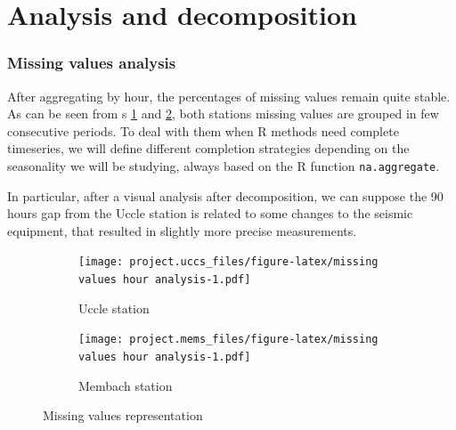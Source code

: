 \documentclass[12pt]{article}
\begin{document}
\section{Analysis and decomposition}
\subsubsection{Missing values analysis}



After aggregating by hour, the percentages of missing values remain quite stable. As can be seen from \figurename{s} \ref{missing-values-seconds:uccs} and \ref{missing-values-seconds:mems}, both stations missing values are grouped in few consecutive periods.
To deal with them when R methods need complete timeseries, we will define different completion strategies depending on the seasonality we will be studying, always based on the R function \texttt{na.aggregate}.

In particular, after a visual analysis after decomposition, we can suppose the 90 hours gap from the Uccle station is related to some changes to the seismic equipment, that resulted in slightly more precise measurements.

\begin{figure}[h]
	\begin{subfigure}{.5\linewidth}
		\texttt{[image: project.uccs\_files/figure-latex/missing values hour analysis-1.pdf]}
		\caption{Uccle station}
		\label{missing-values-seconds:uccs}
	\end{subfigure}
	\begin{subfigure}{.5\linewidth}
		\texttt{[image: project.mems\_files/figure-latex/missing values hour analysis-1.pdf]}
		\caption{Membach station}
		\label{missing-values-seconds:mems}
	\end{subfigure}
	\caption{Missing values representation}
	\label{missing-values-seconds}
\end{figure}
\end{document}
